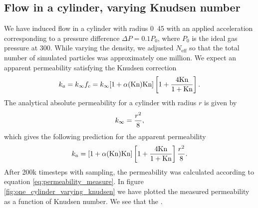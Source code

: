 \subsection{Flow in a cylinder, varying Knudsen number}
We have induced flow in a cylinder with radius \unit{0.45}{\micro\meter} with an applied acceleration corresponding to a pressure difference $\Delta P = 0.1P_0$, where $P_0$ is the ideal gas pressure at \unit{300}{\kelvin}. While varying the density, we adjusted $N_\text{eff}$ so that the total number of simulated particles was approximately one million. We expect an apparent permeability satisfying the Knudsen correction
\begin{align}
	k_a = k_\infty f_c = k_\infty[1 + \alpha(\text{Kn})\text{Kn}]\left[1 + {4\text{Kn}\over 1 + \text{Kn}}\right].
\end{align}
The analytical absolute permeability for a cylinder with radius $r$ is given by\cite{karniadakis2005microflows}
\begin{align}
	\label{eq:permeability_cylinder}
	k_\infty = {r^2\over 8},
\end{align}
which gives the following prediction for the apparent permeability
\begin{align}
	k_a = [1 + \alpha(\text{Kn})\text{Kn}]\left[1 + {4\text{Kn}\over 1 + \text{Kn}}\right] {r^2\over 8}.
\end{align}
After 200k timesteps with sampling, the permeability was calculated according to equation \ref{eq:permeability_measure}. In figure \ref{fig:one_cylinder_varying_knudsen} we have plotted the measured permeability as a function of Knudsen number. We see that the .

